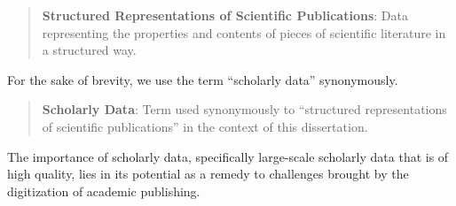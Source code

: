 \begin{quote}
\textbf{Structured Representations of Scientific Publications}: Data representing the properties and contents of pieces of scientific literature in a structured way.
\end{quote}

For the sake of brevity, we use the term ``scholarly data'' synonymously.

\begin{quote}
\textbf{Scholarly Data}: Term used synonymously to ``structured representations of scientific publications'' in the context of this dissertation.
\end{quote}


The importance of scholarly data, specifically large-scale scholarly data that is of high quality, lies in its potential as a remedy to challenges brought by the digitization of academic publishing.



